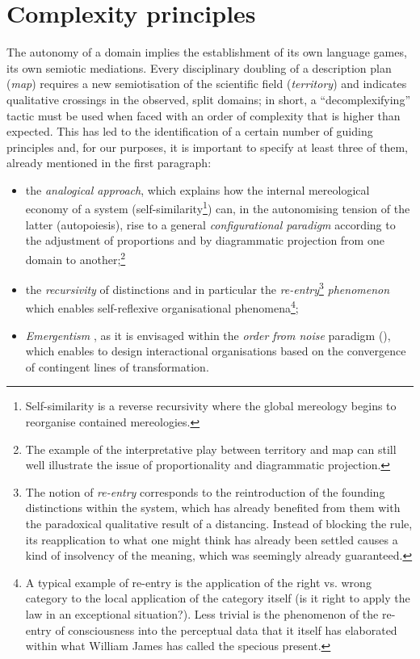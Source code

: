\documentclass[output=paper]{langscibook}
\begin{document}
\section{Complexity principles}\largerpage %

The autonomy of a domain implies the establishment of its own language games, its own semiotic mediations. Every disciplinary doubling of a description plan (\textit{map}) requires a new semiotisation of the scientific field (\textit{territory}) and indicates qualitative crossings in the observed, split domains; in short, a “decomplexifying” tactic must be used when faced with an order of complexity that is higher than expected. This has led to the identification of a certain number of guiding principles and, for our purposes, it is important to specify at least three of them, already mentioned in the first paragraph: 

\begin{itemize}\sloppy
\item the \textit{analogical approach}, which explains how the internal mereological economy of a system (self-similarity\footnote{Self-similarity is a reverse recursivity where the global mereology begins to reorganise contained mereologies.}) can, in the autonomising tension of the latter (autopoiesis), rise to a general \textit{configurational paradigm} according to the adjustment of proportions and by diagrammatic projection from one domain to another;\footnote{The example of the interpretative play between territory and map can still well illustrate the issue of proportionality and diagrammatic projection.}

\item the \textit{recursivity} of distinctions and in particular the \textit{re-entry}\footnote{The notion of \textit{re-entry} corresponds to the reintroduction of the founding distinctions within the system, which has already benefited from them with the paradoxical qualitative result of a distancing. Instead of blocking the rule, its reapplication to what one might think has already been settled causes a kind of insolvency of the meaning, which was seemingly already guaranteed.}  \textit{phenomenon} which enables self-reflexive organisational phenomena\footnote{A typical example of re-entry is the application of the right vs. wrong category to the local application of the category itself (is it right to apply the law in an exceptional situation?). Less trivial is the phenomenon of the re-entry of consciousness into the perceptual data that it itself has elaborated within what William James has called the specious present.};

\item \textit{Emergentism} \citep{Alexander1920}, as it is envisaged within the \textit{order from noise} paradigm (\citealt{Foerster1960}), which enables to design interactional organisations based on the convergence of contingent lines of transformation.
\end{itemize}
\end{document}
